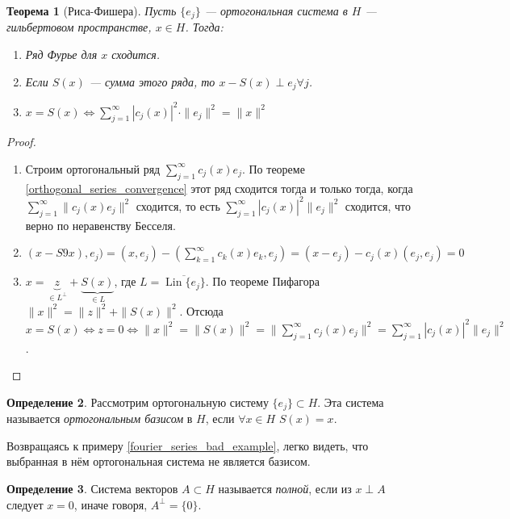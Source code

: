 \documentclass[11pt,openany,a4paper]{scrartcl}
\theoremstyle{plain}
\newtheorem{theorem}{Теорема}[section]
\theoremstyle{definition}
\newtheorem{definition}[theorem]{Определение}
\newcommand\ol{\overline}
\DeclareMathOperator{\Lin}{Lin}
\begin{document}
\begin{theorem}[Риса-Фишера]
    Пусть $\{e_j\}$ — ортогональная система в $H$ — гильбертовом пространстве,
    $x \in H$. Тогда:
    \begin{enumerate}
        \item Ряд Фурье для $x$ сходится.
        \item Если $S(x)$ — сумма этого ряда, то $x - S(x) \perp e_j \forall j$.
        \item $x = S(x) \iff \sum\limits_{j=1}^\infty |c_j(x)|^2\cdot\|e_j\|^2 =
        \|x\|^2$
    \end{enumerate}
\end{theorem}
\begin{proof}
    \begin{enumerate}
        \item Строим ортогональный ряд $\sum\limits_{j=1}^\infty c_j(x)e_j$. По 
        теореме \ref{orthogonal_series_convergence} этот ряд сходится тогда и 
        только тогда, когда $\sum\limits_{j=1}^\infty \|c_j(x)e_j\|^2$
        сходится, то 
        есть $\sum\limits_{j=1}^\infty |c_j(x)|^2\|e_j\|^2$ сходится, что верно по 
        неравенству Бесселя.
        \item $(x - S9x), e_j) = (x, e_j) -
        (\sum\limits_{k=1}^\infty c_k(x)e_k, e_j) = (x - e_j) - c_j(x)(e_j, e_j) = 
        0$
        \item $x = \underbrace{z}_{\in L^\perp} + \underbrace{S(x)}_{\in L}$, где
        $L = \ol{\Lin\{e_j\}}$. По теореме Пифагора
        $\|x\|^2 = \|z\|^2 + \|S(x)\|^2$. Отсюда $x = S(x) \iff z = 0 \iff
        \|x\|^2 = \|S(x)\|^2 = \|\sum\limits_{j=1}^\infty c_j(x) e_j\|^2 =
        \sum\limits_{j=1}^\infty |c_j(x)|^2\|e_j\|^2$.
    \end{enumerate}
\end{proof}

\begin{definition}
    Рассмотрим ортогональную систему $\{e_j\} \subset H$. Эта система называется
    \emph{ортогональным базисом} в $H$, если $\forall x \in H$ $S(x) = x$.
\end{definition}

Возвращаясь к примеру \ref{fourier_series_bad_example}, легко видеть, что 
выбранная в нём ортогональная система не является базисом.

\begin{definition}
    Система векторов $A \subset H$ называется \emph{полной}, если из $x \perp A$
    следует $x = 0$, иначе говоря, $A^\perp = \{0\}$.
\end{definition}
\end{document}

